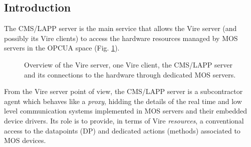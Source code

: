 \subsection{Introduction}

The CMS/LAPP  server is the main  service that allows the  Vire server
(and  possibly its  Vire  clients) to  access  the hardware  resources
managed     by     MOS     servers      in     the     OPCUA     space
(Fig. \ref{fig:cms_server:layout_0a}).

\begin{figure}[h]
\begin{center}
\scalebox{0.75}{}
\end{center}
\caption{Overview of  the Vire server,  one Vire client,  the CMS/LAPP
  server and  its connections  to the  hardware through  dedicated MOS
  servers.}
\label{fig:cms_server:layout_0a}
\end{figure}

\noindent From the Vire server point of view, the CMS/LAPP server is a
subcontractor agent which behaves like  a \emph{proxy}, hidding the
details  of  the  real  time   and  low  level  communication  systems
implemented in  MOS servers  and their  embedded device  drivers.  Its
role is to provide, in  terms of Vire \emph{resources}, a conventional
access  to  the  datapoints   (DP)  and  dedicated  actions  (methods)
associated to MOS devices.

\vfill
\afterpage{\clearpage}
\pagebreak

